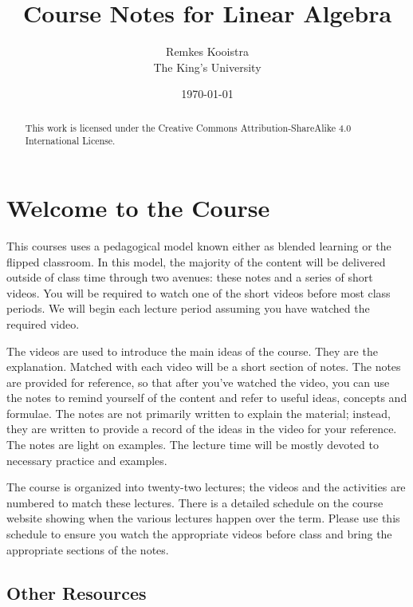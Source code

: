 \documentclass[fleqn]{report}
\begin{document}
\title{Course Notes for Linear Algebra}
\author{Remkes Kooistra \\
	The King's University}
\date{\today}
\maketitle

\setcounter{tocdepth}{0}
\tableofcontents
{}

\renewcommand{\chaptername}{Lecture}
\renewcommand{\abstractname}{License}

\begin{abstract}
This work is licensed under the Creative Commons
Attribution-ShareAlike 4.0 International License.
\end{abstract}

\chapter*{Welcome to the Course}
\label{Welcome to the Course}

This courses uses a pedagogical model known either as blended
learning or the flipped classroom. In this model, the majority of the
content will be delivered outside of class time through
two avenues: these notes and a series of short videos.
You will be required to watch one of the short videos 
before most class periods. We will
begin each lecture period assuming you have watched the
required video.

The videos are used to introduce the main ideas of the
course. They are the explanation. Matched with each video 
will be a short section of notes. The
notes are provided for reference, so that after you've watched
the video, you can use the notes to remind yourself of the
content and refer to useful ideas, concepts and formulae. The
notes are not primarily written to explain the material;
instead, they are written to provide a record of the ideas in
the video for your reference. The notes are light on
examples. The lecture time will be mostly devoted to
necessary practice and examples.

The course is organized into twenty-two lectures; the videos
and the activities are numbered to match these lectures. There
is a detailed schedule on the course website showing when the
various lectures happen over the term. Please use this
schedule to ensure you watch the appropriate videos before
class and bring the appropriate sections of the notes. 

\section*{Other Resources}
\end{document}

